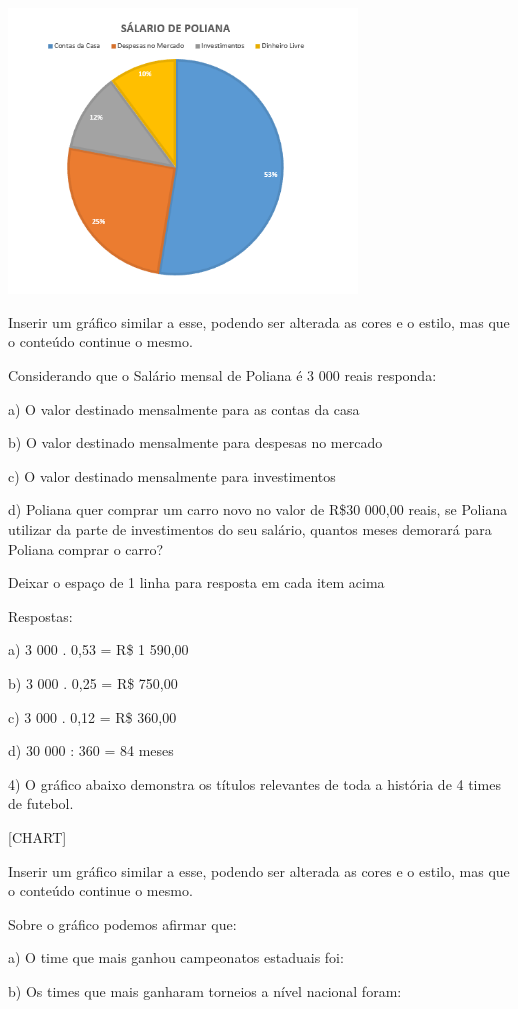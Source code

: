 {\includegraphics[width=3.65in,height=2.98179in]{./imgSAEB_8_MAT/media/image41.png}

Inserir um gráfico similar a esse, podendo ser alterada as cores e o
estilo, mas que o conteúdo continue o mesmo.

Considerando que o Salário mensal de Poliana é 3 000 reais responda:

a) O valor destinado mensalmente para as contas da casa

b) O valor destinado mensalmente para despesas no mercado

c) O valor destinado mensalmente para investimentos

d) Poliana quer comprar um carro novo no valor de R\$30 000,00 reais, se
Poliana utilizar da parte de investimentos do seu salário, quantos meses
demorará para Poliana comprar o carro?

Deixar o espaço de 1 linha para resposta em cada item acima

Respostas:

a) 3 000 . 0,53 = R\$ 1 590,00

b) 3 000 . 0,25 = R\$ 750,00

c) 3 000 . 0,12 = R\$ 360,00

d) 30 000 : 360 = 84 meses

4) O gráfico abaixo demonstra os títulos relevantes de toda a história
de 4 times de futebol.

{{[}CHART{]}}

Inserir um gráfico similar a esse, podendo ser alterada as cores e o
estilo, mas que o conteúdo continue o mesmo.

Sobre o gráfico podemos afirmar que:

a) O time que mais ganhou campeonatos estaduais foi:

b) Os times que mais ganharam torneios a nível nacional foram:

}
